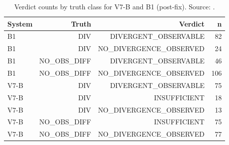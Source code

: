 \begin{table}[t]
\centering\scriptsize
\caption{Verdict counts by truth class for V7-B and B1 (post-fix). Source: .}
\label{tab:classcounts}
\begin{tabular}{lrrr}
\hline
System & Truth & Verdict & n \\
\hline
B1 & DIV & DIVERGENT\_OBSERVABLE & 82 \\
B1 & DIV & NO\_DIVERGENCE\_OBSERVED & 24 \\
B1 & NO\_OBS\_DIFF & DIVERGENT\_OBSERVABLE & 46 \\
B1 & NO\_OBS\_DIFF & NO\_DIVERGENCE\_OBSERVED & 106 \\
V7-B & DIV & DIVERGENT\_OBSERVABLE & 75 \\
V7-B & DIV & INSUFFICIENT & 18 \\
V7-B & DIV & NO\_DIVERGENCE\_OBSERVED & 13 \\
V7-B & NO\_OBS\_DIFF & INSUFFICIENT & 75 \\
V7-B & NO\_OBS\_DIFF & NO\_DIVERGENCE\_OBSERVED & 77 \\
\hline
\end{tabular}
\end{table}
